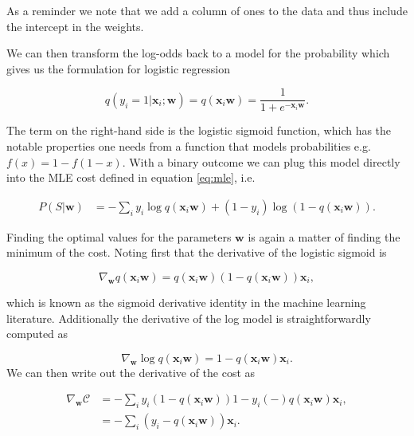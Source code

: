 \noindent As a reminder we note that we add a column of ones to the data and thus include the intercept in the weights. 

We can then transform the log-odds back to a model for the probability which gives us the formulation for logistic regression 

\begin{equation}
q(y_i=1 | \boldsymbol{x}_i; \boldsymbol{w})= q(\boldsymbol{x}_i\boldsymbol{w}) = \frac{1}{1 + e^{-\boldsymbol{x}_i \boldsymbol{w}}}.
\end{equation} 

\noindent The term on the right-hand side is the logistic sigmoid function, which has the notable properties one needs from a function that models probabilities e.g. $f(x) = 1-f(1-x)$. With a binary outcome we can plug this model directly into the MLE cost defined in equation \ref{eq:mle}, i.e. 

\begin{align}\label{eq:mle_lr}
P(S|\boldsymbol{w}) &=  - \sum_i y_i\log q (\boldsymbol{x}_i\boldsymbol{w}) + (1-y_i)\log\left(1-q(\boldsymbol{x}_i\boldsymbol{w})\right).
\end{align}

\noindent Finding the optimal values for the parameters $\boldsymbol{w}$ is again a matter of finding the minimum of the cost. Noting first that the derivative of the logistic sigmoid is 

\begin{equation}
\nabla_{\boldsymbol{w}} q(\boldsymbol{x}_i \boldsymbol{w}) = q(\boldsymbol{x}_i \boldsymbol{w}) (1 - q(\boldsymbol{x}_i \boldsymbol{w}))\boldsymbol{x}_i,
\end{equation}

\noindent which is known as the sigmoid derivative identity in the machine learning literature. Additionally the derivative of the log model is straightforwardly computed as 

\begin{equation}
\nabla_{\boldsymbol{w}} \log q(\boldsymbol{x}_i \boldsymbol{w}) = 1- q(\boldsymbol{x}_i \boldsymbol{w})\boldsymbol{x}_i.
\end{equation}
 We can then write out the derivative of the cost as 

\begin{align}
\nabla_{\boldsymbol{w}} \mathcal{C} &= - \sum_i y_i (1 - q(\boldsymbol{x}_i \boldsymbol{w})) 1-y_i (-) q(\boldsymbol{x}_i \boldsymbol{w})\boldsymbol{x}_i, \\
&= - \sum_i \left(y_i -  q(\boldsymbol{x}_i \boldsymbol{w})\right)\boldsymbol{x}_i.
\end{align}

